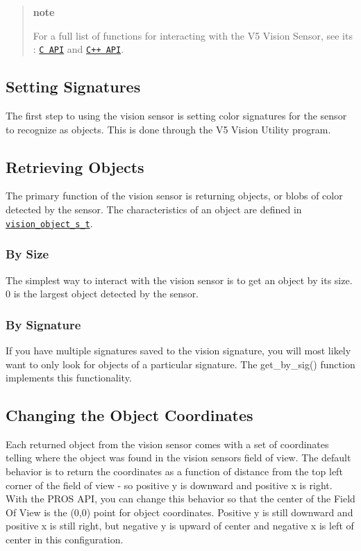 \begin{quote}
{\bfseries note}

For a full list of functions for interacting with the V5 Vision Sensor, see its \+: \href{../../api/c/vision.html}{\tt C A\+PI} and \href{../../api/cpp/vision.html}{\tt C++ A\+PI}. \end{quote}


\subsection*{Setting Signatures}

The first step to using the vision sensor is setting color signatures for the sensor to recognize as objects. This is done through the V5 Vision Utility program.

\subsection*{Retrieving Objects}

The primary function of the vision sensor is returning objects, or blobs of color detected by the sensor. The characteristics of an object are defined in \href{../../api/c/vision.html#vision_object_s_t}{\tt vision\+\_\+object\+\_\+s\+\_\+t}.

\subsubsection*{By Size}

The simplest way to interact with the vision sensor is to get an object by its size. 0 is the largest object detected by the sensor.

\subsubsection*{By Signature}

If you have multiple signatures saved to the vision signature, you will most likely want to only look for objects of a particular signature. The {\ttfamily get\+\_\+by\+\_\+sig()} function implements this functionality.

\subsection*{Changing the Object Coordinates}

Each returned object from the vision sensor comes with a set of coordinates telling where the object was found in the vision sensor\textquotesingle{}s field of view. The default behavior is to return the coordinates as a function of distance from the top left corner of the field of view -\/ so positive y is downward and positive x is right. With the P\+R\+OS A\+PI, you can change this behavior so that the center of the Field Of View is the (0,0) point for object coordinates. Positive y is still downward and positive x is still right, but negative y is upward of center and negative x is left of center in this configuration.

